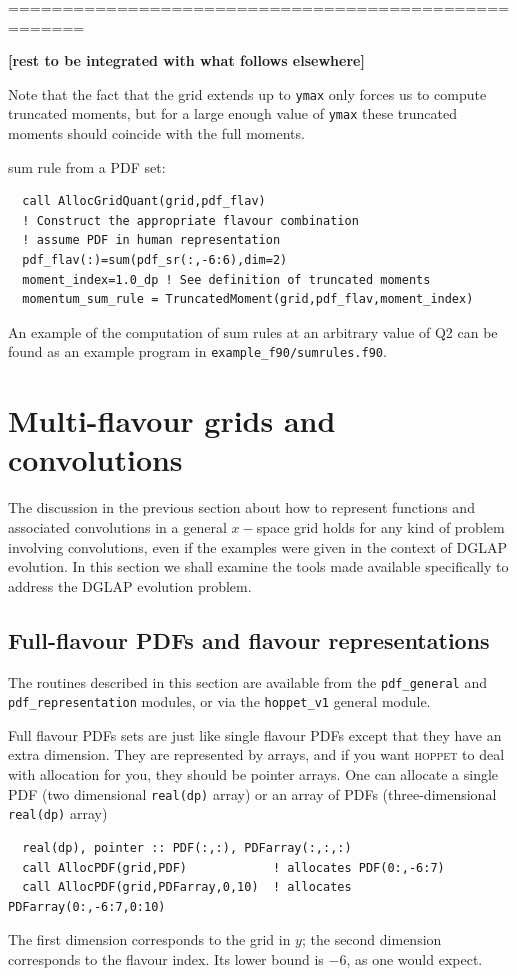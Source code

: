 \documentclass[12pt]{article}
\newcommand{\comment}[1]{\textbf{[#1]}}
\newcommand{\hoppet}{\textsc{hoppet}\xspace}
\newcommand{\ttt}[1]{\texttt{#1}}
\begin{document}
 =====================================================

 \comment{rest to be integrated with what follows elsewhere}

Note that the fact that the grid extends up to {\tt ymax} only
forces us to compute truncated moments, but for a large enough 
value of  {\tt ymax} these truncated moments should coincide
with the full moments.


sum rule
from a PDF set:
\begin{lstlisting}
  call AllocGridQuant(grid,pdf_flav)
  ! Construct the appropriate flavour combination 
  ! assume PDF in human representation
  pdf_flav(:)=sum(pdf_sr(:,-6:6),dim=2)
  moment_index=1.0_dp ! See definition of truncated moments 
  momentum_sum_rule = TruncatedMoment(grid,pdf_flav,moment_index)
\end{lstlisting}
An example of the computation of sum rules at an
arbitrary value of Q2 can be found as an example
program 
in {\tt example\_f90/sumrules.f90}.




\section{Multi-flavour grids and convolutions}
\label{sec:dglapstructs}

The discussion in the previous section 
about how to represent functions and associated convolutions
in a general $x-$space grid holds for any kind of problem involving
convolutions, even if the examples were given in the context of DGLAP
evolution. In this section we shall examine the tools made available
specifically to address the DGLAP evolution problem.


\subsection{Full-flavour PDFs and flavour representations}
\label{sec:pdf-objects}

The routines described in this section
 are available from the \ttt{pdf\_general}
and \ttt{pdf\_representation} modules, or via the \ttt{hoppet\_v1}
general module.

Full flavour PDFs sets are just like single flavour PDFs except that they
have an extra dimension. They are represented by arrays, and if you
want \hoppet to deal with allocation for you, they should be pointer
arrays. One can allocate a single PDF (two dimensional
\texttt{real(dp)} array) or an array of PDFs (three-dimensional
\texttt{real(dp)} array)
\begin{lstlisting}
  real(dp), pointer :: PDF(:,:), PDFarray(:,:,:)
  call AllocPDF(grid,PDF)            ! allocates PDF(0:,-6:7)
  call AllocPDF(grid,PDFarray,0,10)  ! allocates PDFarray(0:,-6:7,0:10)
\end{lstlisting}
The first dimension corresponds to the grid in $y$; the second
dimension corresponds to the flavour index. Its lower bound is $-6$,
as one would expect. 
\end{document}
